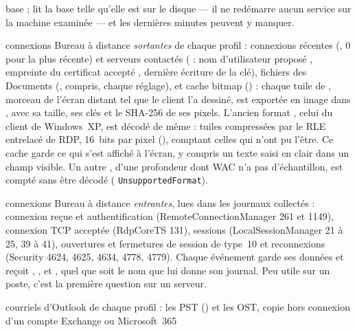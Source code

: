 \documentclass[11pt,a4paper,oneside]{report}
\begin{document}
\begin{description}[style=nextline,leftmargin=1.2em]
        base ; \wac{} lit la base telle qu'elle est sur le disque --- il ne
        redémarre aucun service sur la machine examinée --- et les dernières
        minutes peuvent y manquer.
  \item[\fichier{rdp\_client.json}] connexions Bureau à distance \emph{sortantes} de
        chaque profil : connexions récentes (,
         0 pour la plus récente) et serveurs contactés
        ( : nom d'utilisateur proposé ,
        empreinte du certificat accepté , dernière écriture de
        la clé), fichiers  des Documents (,
         compris, chaque réglage), et cache bitmap
        () : chaque tuile de , morceau de
        l'écran distant tel que le client l'a dessiné, est exportée en image
        dans , avec
        sa taille, ses clés et le SHA-256 de ses pixels. L'ancien format
        , celui du client de Windows~XP, est décodé de
        même : tuiles compressées par le RLE entrelacé de RDP, 16~bits par
        pixel (),  comptant celles qui
        n'ont pu l'être. Ce cache garde ce qui s'est affiché à l'écran,
        y compris un texte saisi en clair dans un champ visible. Un autre
        , d'une profondeur dont WAC n'a pas d'échantillon, est
        compté sans être décodé (
        \texttt{UnsupportedFormat}).
  \item[\fichier{rdp\_server.json}] connexions Bureau à distance \emph{entrantes},
        lues dans les journaux collectés : connexion reçue et authentification
        (RemoteConnectionManager 261 et 1149), connexion TCP acceptée (RdpCoreTS
        131), sessions (LocalSessionManager 21 à 25, 39 à 41), ouvertures et
        fermetures de session de type~10 et reconnexions (Security 4624, 4625,
        4634, 4778, 4779). Chaque événement garde ses données et reçoit
        , ,  et
        , quel que soit le nom que lui donne son journal. Peu
        utile sur un poste, c'est la première question sur un serveur.
  \item[\fichier{emails.json}] courriels d'Outlook de chaque profil : les PST
        () et les OST, copie
        hors connexion d'un compte Exchange ou Microsoft~365

\end{description}
\end{document}
